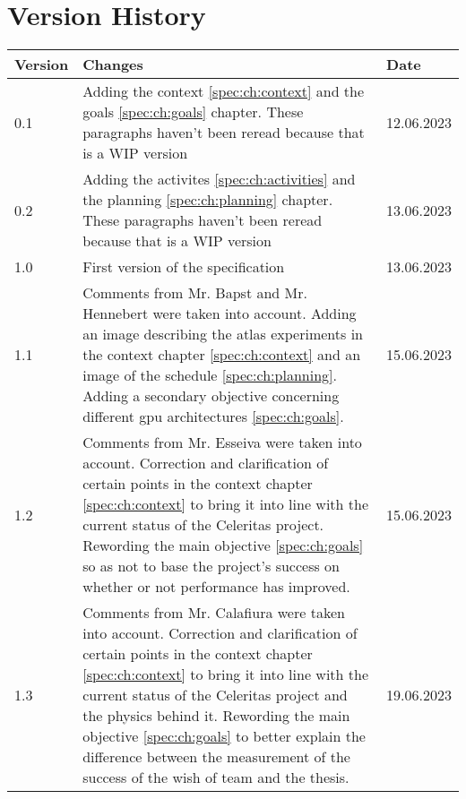 \chapter{Version History}
\label{chap:spec-versions}

\begin{tabular}{|m{}|m{}|m{}|}
 \hline
 \textbf{Version} & \textbf{Changes} & \textbf{Date} \\ [0.5ex]
 \hline
 0.1 & Adding the context \ref{spec:ch:context} and the goals \ref{spec:ch:goals} chapter. These paragraphs haven't been reread because that is a WIP version & 12.06.2023  \\
 \hline
 0.2 & Adding the activites \ref{spec:ch:activities} and the planning \ref{spec:ch:planning} chapter. These paragraphs haven't been reread because that is a WIP version & 13.06.2023  \\
 \hline
 1.0 & First version of the specification & 13.06.2023  \\
 \hline
 1.1 &
 Comments from Mr. Bapst and Mr. Hennebert were taken into account.
 Adding an image describing the \acrshort{atlas} experiments in the context chapter \ref{spec:ch:context} and an image of the schedule \ref{spec:ch:planning}.
 Adding a secondary objective concerning different \acrshort{gpu} architectures \ref{spec:ch:goals}.
 & 15.06.2023  \\
 \hline
 1.2 &
 Comments from Mr. Esseiva were taken into account.
 Correction and clarification of certain points in the context chapter \ref{spec:ch:context} to bring it into line with the current status of the Celeritas project.
 Rewording the main objective \ref{spec:ch:goals} so as not to base the project's success on whether or not performance has improved.
 & 15.06.2023  \\
 \hline
 1.3 &
 Comments from Mr. Calafiura were taken into account.
 Correction and clarification of certain points in the context chapter \ref{spec:ch:context} to bring it into line with the current status of the Celeritas project and the physics behind it.
 Rewording the main objective \ref{spec:ch:goals} to better explain the difference between the measurement of the success of the wish of team and the thesis.
 & 19.06.2023  \\
 \hline
\end{tabular}

